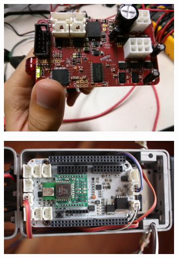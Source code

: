 \begin{figure}[thpb]
\centering
\begin{subfigure}{.29\linewidth}
      \centering
      \includegraphics[width=\columnwidth]{tex/img/motor_board}
      \caption{}
      \label{fig:motor_board}
\end{subfigure}
\begin{subfigure}{.32\linewidth}
      \centering
      \includegraphics[width=\columnwidth]{tex/img/sensor_board_new}
      \caption{}
      \label{fig:sensor_board}
\end{subfigure}
\begin{subfigure}{.29\linewidth}
      \centering

\end{subfigure}
\end{figure}
